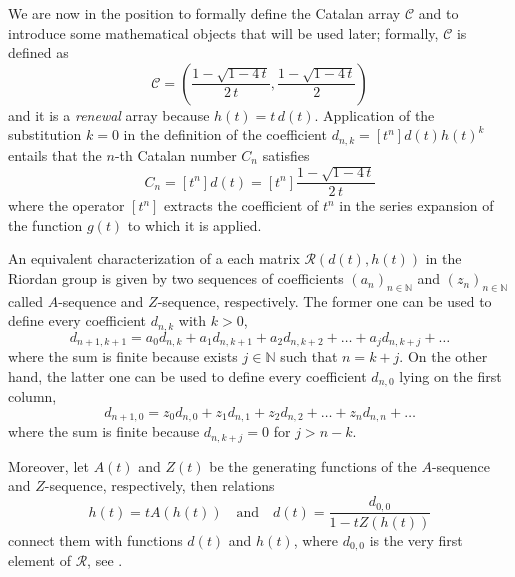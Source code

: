 We are now in the position to formally define the Catalan
array $\mathcal{C}$ and to introduce some mathematical objects
that will be used later; formally, $\mathcal{C}$ is defined as
\begin{displaymath}
    \mathcal{C}=\left(\frac{1-\sqrt{1-4\,t}}{2\,t},
        \frac{1-\sqrt{1-4\,t}}{2}\right)
\end{displaymath}
and it is a \emph{renewal} array \cite{rogers:1977} because
$h(t)=t\,d(t)$. Application of the substitution $k=0$ in the definition of the
coefficient $\displaystyle d_{n,k} = [t^{n}]d(t)h(t)^{k}$ entails that the
$n$-th Catalan number $C_{n}$ satisfies
\begin{displaymath}
    C_{n} = [t^{n}]d(t)= [t^{n}]\frac{1-\sqrt{1-4\,t}}{2\,t}
\end{displaymath}
where the operator $[t^{n}]$ extracts the coefficient of $t^{n}$ in the series expansion
of the function $g(t)$ to which it is applied.

An equivalent characterization of a each matrix $\mathcal{R}(d(t), h(t))$ in
the Riordan group is given by two sequences of coefficients
$\left(a_{n}\right)_{n\in\mathbb{N}}$  and
$\left(z_{n}\right)_{n\in\mathbb{N}}$ called $A$-sequence and $Z$-sequence,
respectively. The former one can be used to define every
coefficient $d_{n,k}$ with $k>0$,
\begin{equation}
    d_{n+1, k+1} = a_{0}d_{n,k} + a_{1}d_{n,k+1} + a_{2}d_{n,k+2} + \ldots + a_{j}d_{n,k+j} + \ldots %
\end{equation}
where the sum is finite because exists $j\in\mathbb{N}$ such that $n=k+j$. On
the other hand, the latter one can be used to define every coefficient
$d_{n,0}$ lying on the first column,
\begin{equation}
    d_{n+1, 0} = z_{0}d_{n,0} + z_{1}d_{n,1} + z_{2}d_{n,2} + \ldots + z_{n}d_{n,n} + \ldots %
\end{equation}
where the sum is finite because $d_{n,k+j}=0$ for $j>n-k$.

Moreover, let $A(t)$ and $Z(t)$ be the generating functions of the $A$-sequence
and $Z$-sequence, respectively, then relations
\begin{equation}
    h(t) = tA(h(t)) \quad\text{and}\quad d(t)=\frac{d_{0,0}}{1-tZ(h(t))}
\end{equation}
connect them with functions $d(t)$ and $h(t)$,
where $d_{0,0}$ is the very first element %
of $\mathcal{R}$, see \cite{merlini:some:alternative:characterizations:1997}.

